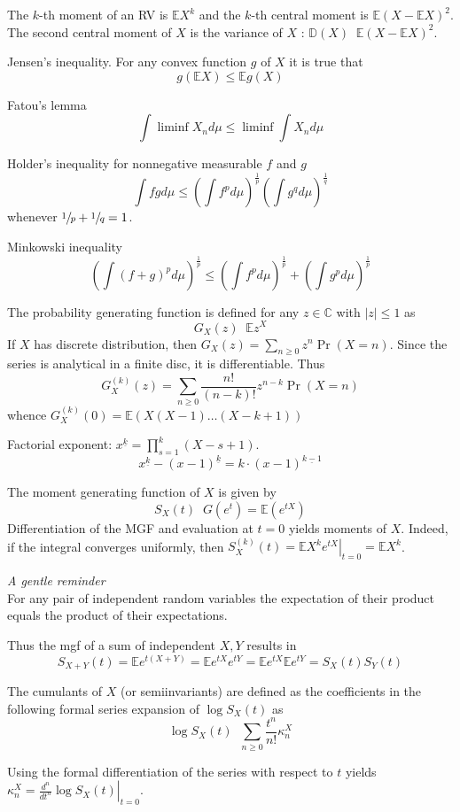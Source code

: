 \documentclass[a4paper]{article}
\newcommand{\brac}[1]{{\left ( #1 \right )}}
\newcommand{\induc}[1]{{\left . #1 \right \vert}}
\newcommand{\abs}[1]{{\left | #1 \right |}}
\newcommand{\Cplx}{\mathbb{C}}
\newcommand{\Ex}{\mathbb{E}}
\newcommand{\defn}{\mathop{\overset{\Delta}{=}}\nolimits}
\begin{document}
The $k$-th moment of an RV is $\Ex X^k$ and the $k$-th central moment is $\Ex\brac{ X - \Ex X}^2$.
The second central moment of $X$ is the variance of $X$ : $\mathbb{D}(X) \defn \Ex\brac{ X - \Ex X}^2$.

Jensen's inequality. For any convex function $g$ of $X$ it is true that 
\[g\brac{\Ex X}\leq \Ex g(X) \]

Fatou's lemma \[\int \liminf X_n d\mu \leq \liminf \int X_n d\mu\]

Holder's inequality for nonnegative measurable $f$ and $g$ \[\int fg d\mu \leq \brac{\int f^p d\mu}^\frac{1}{p}\brac{\int g^q d\mu}^\frac{1}{q}\] whenever $\sfrac{1}{p}+\sfrac{1}{q}=1$.

Minkowski inequality \[\brac{\int {(f+g)}^p d\mu}^\frac{1}{p}\leq \brac{\int f^p d\mu}^\frac{1}{p} + \brac{\int g^p d\mu}^\frac{1}{p}\]

The probability generating function is defined for any $z\in \Cplx$ with $\abs{z}\leq 1$ as \[G_X(z) \defn \Ex z^X\]
If $X$ has discrete distribution, then $G_X(z) = \sum_{n\geq 0} z^n \Pr(X=n)$.
Since the series is analytical in a finite disc, it is differentiable.
Thus \[G_X^{(k)}(z) = \sum_{n\geq 0} \frac{n!}{(n-k)!} z^{n-k} \Pr(X=n) \]
whence $G_X^{(k)}(0) = \Ex \brac{X(X-1)\ldots (X-k+1)}$

Factorial exponent: $x^{\underline{k}} = \prod_{s=1}^k (X-s+1)$.
\[x^{\underline{k}} - \brac{x-1}^{\underline{k}} = k \cdot \brac{x-1}^{\underline{k-1}} \]

The moment generating function of $X$ is given by \[S_X(t) \defn G(e^t) = \Ex(e^{tX})\]
Differentiation of the MGF and evaluation at $t=0$ yields moments of $X$.
Indeed, if the integral converges uniformly, then $S_X^{(k)}(t) = \induc{\Ex X^k e^{tX}}_{t=0} = \Ex X^k$.

\emph{A gentle reminder}\hfill \\ For any pair of independent random variables the expectation of their product equals the product of their expectations.

Thus the mgf of a sum of independent $X,Y$ results in \[S_{X+Y}(t) = \Ex e^{t(X+Y)} = \Ex e^{tX} e^{tY} = \Ex e^{tX} \Ex e^{tY} = S_X(t) S_Y(t)\]

The cumulants of $X$ (or semiinvariants) are defined as the coefficients in the following formal series expansion of $\log S_X(t)$ as
\[\log S_X(t) \defn \sum_{n\geq 0} \frac{t^n}{n!} \kappa_n^X\]

Using the formal differentiation of the series with respect to $t$ yields
$\kappa_n^X = \induc{\frac{d^n}{dt^n} \log S_X(t)}_{t=0}$.
\end{document}
